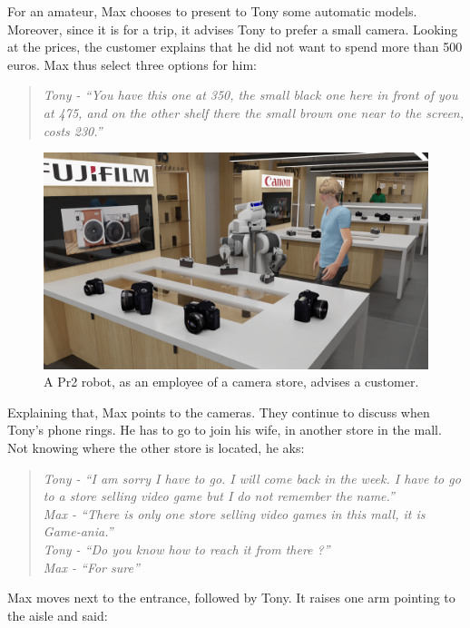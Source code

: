 For an amateur, Max chooses to present to Tony some automatic models. Moreover, since it is for a trip, it advises Tony to prefer a small camera. Looking at the prices, the customer explains that he did not want to spend more than 500 euros. Max thus select three options for him:

\begin{quote} 
\centering 
\textit{
Tony - ``You have this one at 350, the small black one here in front of you at 475, and on the other shelf there the small brown one near to the screen, costs 230.'' }
\end{quote}

\begin{figure}[h!]
\centering
\includegraphics[width=\textwidth]{figures/introduction/camera_store_2.png}
\caption{\label{fig:cam_store} A Pr2 robot, as an employee of a camera store, advises a customer. }
\end{figure}

Explaining that, Max points to the cameras. They continue to discuss when Tony's phone rings. He has to go to join his wife, in another store in the mall. Not knowing where the other store is located, he aks:

\begin{quote}
\textit{
Tony - ``I am sorry I have to go. I will come back in the week. I have to go to a store selling video game but I do not remember the name.'' \\
Max - ``There is only one store selling video games in this mall, it is Game-ania.'' \\
Tony - ``Do you know how to reach it from there ?'' \\
Max - ``For sure''}
\end{quote}

Max moves next to the entrance, followed by Tony. It raises one arm pointing to the aisle and said:

